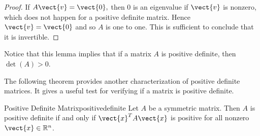 \begin{proof}
If $A\vect{v}=\vect{0},$ then $0$ is an eigenvalue if $\vect{v}$ is nonzero, which
does not happen for a positive definite matrix. Hence $\vect{v}=\vect{0}$ and
so $A$ is one to one. This is sufficient to conclude that it is invertible.
\end{proof}

Notice that this lemma implies that if a matrix $A$ is positive definite, then $\det(A) > 0$. 

The following theorem provides another characterization of positive definite matrices. It gives a useful test for verifying if a matrix is positive definite. 

\begin{theorem}{Positive Definite Matrix}{positivedefinite}
Let $A$ be a symmetric matrix. Then $A$ is positive definite if and
only if $\vect{x}^T A \vect{x} $ is positive for all nonzero $\vect{x}
\in \mathbb{R}^n$.
\end{theorem}

